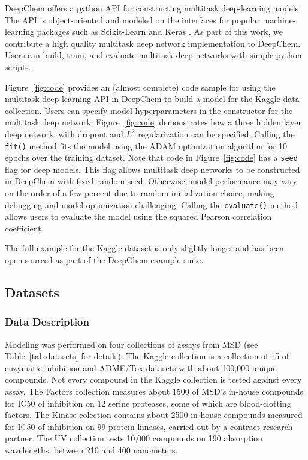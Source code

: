 DeepChem offers a python API for constructing multitask deep-learning models. The API is object-oriented and modeled on the interfaces for popular machine-learning packages such as Scikit-Learn \cite{pedregosa2011scikit} and Keras \cite{chollet2015keras}. As part of this work, we contribute a high quality multitask deep network implementation to DeepChem.
Users can build, train, and evaluate multitask deep networks with simple python scripts.

Figure~\ref{fig:code} provides an (almost complete) code sample for using the multitask deep learning API in DeepChem to build a model for the Kaggle data collection. Users can specify model hyperparameters in the constructor for the multitask deep network. Figure~\ref{fig:code} demonstrates how a three hidden layer deep network, with dropout \cite{srivastava2014dropout} and $L^2$ regularization can be specified. Calling the \texttt{fit()} method fits the model using the ADAM optimization algorithm \cite{kingma2014adam} for 10 epochs over the training dataset. Note that code in 
Figure~\ref{fig:code} has a \texttt{seed} flag for deep models. This flag allows multitask deep networks to be constructed in DeepChem with fixed random seed. Otherwise, model performance may vary on the order of a few percent due to random initialization choice, making debugging and model optimization challenging. Calling the \texttt{evaluate()} method allows users to evaluate the model using the squared Pearson correlation coefficient.

The full example for the Kaggle dataset is only slightly longer and has been open-sourced as part of the DeepChem example suite.

\subsection{Datasets}

\subsubsection{Data Description}
Modeling was performed on four collections of assays from MSD (see Table~\ref{tab:datasets} for details). The Kaggle collection is a collection of 15 of enzymatic inhibition and ADME/Tox datasets \cite{ma2015deep} with about 100,000
unique compounds. Not every compound in the Kaggle collection is tested against every assay. The Factors collection measures about 1500 of MSD's in-house compounds for IC50 of inhibition on 12 serine proteases, some of which are blood-clotting factors. The Kinase colection contains about 2500 in-house compounds measured for IC50 of inhibition on 99 protein kinases, carried out by a contract research partner. The UV collection tests 10,000
compounds on 190 absorption wavelengths, between 210 and 400 nanometers.

